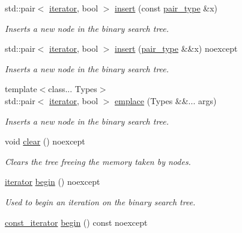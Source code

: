 \begin{DoxyCompactItemize}
std\+::pair$<$ \hyperlink{classbst_a429b0445783ff6486882db5dee900ce0}{iterator}, bool $>$ \hyperlink{classbst_aaaeffdb4fae1103a3f6185c74ce43281}{insert} (const \hyperlink{classbst_a7b11cca2a3b4394915600194f741ab16}{pair\+\_\+type} \&x)
\begin{DoxyCompactList}\small\item\em Inserts a new node in the binary search tree. \end{DoxyCompactList}\item 
std\+::pair$<$ \hyperlink{classbst_a429b0445783ff6486882db5dee900ce0}{iterator}, bool $>$ \hyperlink{classbst_aafe95673b19139abd52e242e5d72b66d}{insert} (\hyperlink{classbst_a7b11cca2a3b4394915600194f741ab16}{pair\+\_\+type} \&\&x) noexcept
\begin{DoxyCompactList}\small\item\em Inserts a new node in the binary search tree. \end{DoxyCompactList}\item 
{\footnotesize template$<$class... Types$>$ }\\std\+::pair$<$ \hyperlink{classbst_a429b0445783ff6486882db5dee900ce0}{iterator}, bool $>$ \hyperlink{classbst_a03e09650b371d423315f26520d6e34a6}{emplace} (Types \&\&... args)
\begin{DoxyCompactList}\small\item\em Inserts a new node in the binary search tree. \end{DoxyCompactList}\item 
\mbox{\label{classbst_a368b8f209f5158d55374a7cdbd110962}} 
void \hyperlink{classbst_a368b8f209f5158d55374a7cdbd110962}{clear} () noexcept
\begin{DoxyCompactList}\small\item\em Clears the tree freeing the memory taken by nodes. \end{DoxyCompactList}\item 
\hyperlink{classbst_a429b0445783ff6486882db5dee900ce0}{iterator} \hyperlink{classbst_a74c68495fd963c501084d129d4c0f5b1}{begin} () noexcept
\begin{DoxyCompactList}\small\item\em Used to begin an iteration on the binary search tree. \end{DoxyCompactList}\item 
\hyperlink{classbst_a72485696d999bf489c6156f6327a2163}{const\+\_\+iterator} \hyperlink{classbst_a8631fb03856c2cd4602fc7446502195c}{begin} () const noexcept

\end{DoxyCompactItemize}
